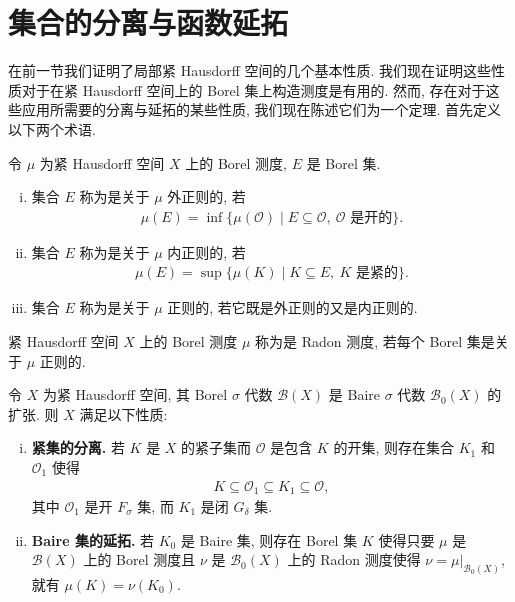 \documentclass[../../main.tex]{subfiles}
\begin{document}
\section{集合的分离与函数延拓}\label{section:ch21-分离延拓}

在前一节我们证明了局部紧 Hausdorff 空间的几个基本性质. 我们现在证明这些性质对于在紧 Hausdorff 空间上的 Borel 集上构造测度是有用的. 然而, 存在对于这些应用所需要的分离与延拓的某些性质, 我们现在陈述它们为一个定理. 首先定义以下两个术语.

\begin{definition}\label{definition:ch21-内外正则}
令 $\mu$ 为紧 Hausdorff 空间 $X$ 上的 Borel 测度, $E$ 是 Borel 集.
\begin{enumerate}[(i)]
\item 集合 $E$ 称为是关于 $\mu$ 外正则的, 若
\begin{align*}
\mu(E)=\inf\{\mu(\mathcal{O})\mid E\subseteq\mathcal{O},\ \mathcal{O}\text{ 是开的}\}.
\end{align*}
\item 集合 $E$ 称为是关于 $\mu$ 内正则的, 若
\begin{align*}
\mu(E)=\sup\{\mu(K)\mid K\subseteq E,\ K\text{ 是紧的}\}.
\end{align*}
\item 集合 $E$ 称为是关于 $\mu$ 正则的, 若它既是外正则的又是内正则的.
\end{enumerate}
\end{definition}

\begin{definition}[Radon 测度]\label{definition:ch21-radon}
紧 Hausdorff 空间 $X$ 上的 Borel 测度 $\mu$ 称为是 Radon 测度, 若每个 Borel 集是关于 $\mu$ 正则的.
\end{definition}

\begin{theorem}[分离与延拓定理]\label{theorem:ch21-分离延拓}
令 $X$ 为紧 Hausdorff 空间, 其 Borel $\sigma$ 代数 $\mathcal{B}(X)$ 是 Baire $\sigma$ 代数 $\mathcal{B}_{0}(X)$ 的扩张. 则 $X$ 满足以下性质:
\begin{enumerate}[(i)]
\item \textbf{紧集的分离.} 若 $K$ 是 $X$ 的紧子集而 $\mathcal{O}$ 是包含 $K$ 的开集, 则存在集合 $K_{1}$ 和 $\mathcal{O}_{1}$ 使得
\begin{align*}
K\subseteq\mathcal{O}_{1}\subseteq K_{1}\subseteq\mathcal{O},
\end{align*}
其中 $\mathcal{O}_{1}$ 是开 $F_{\sigma}$ 集, 而 $K_{1}$ 是闭 $G_{\delta}$ 集.
\item \textbf{Baire 集的延拓.} 若 $K_{0}$ 是 Baire 集, 则存在 Borel 集 $K$ 使得只要 $\mu$ 是 $\mathcal{B}(X)$ 上的 Borel 测度且 $\nu$ 是 $\mathcal{B}_{0}(X)$ 上的 Radon 测度使得 $\nu=\mu|_{\mathcal{B}_{0}(X)}$, 就有 $\mu(K)=\nu(K_{0})$.
\end{enumerate}
\end{theorem}
\end{document}

